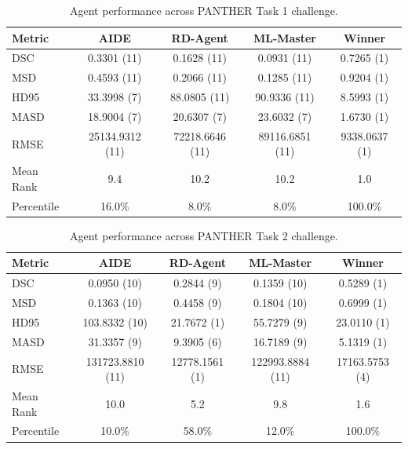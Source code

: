 \begin{table}[htbp]
\centering
\small
\caption{Agent performance across PANTHER Task 1 challenge.}
\vspace{3pt} \label{tab:panther-task1}
\begin{tabular}{lcccc}
\toprule
\textbf{Metric} & \textbf{AIDE} & \textbf{RD-Agent} & \textbf{ML-Master} & \textbf{Winner} \\
\midrule
DSC & 0.3301 (11) & 0.1628 (11) & 0.0931 (11) & 0.7265 (1) \\
MSD & 0.4593 (11) & 0.2066 (11) & 0.1285 (11) & 0.9204 (1) \\
HD95 & 33.3998 (7) & 88.0805 (11) & 90.9336 (11) & 8.5993 (1) \\
MASD & 18.9004 (7) & 20.6307 (7) & 23.6032 (7) & 1.6730 (1) \\
RMSE & 25134.9312 (11) & 72218.6646 (11) & 89116.6851 (11) & 9338.0637 (1) \\
\midrule
Mean Rank & 9.4 & 10.2 & 10.2 & 1.0 \\
Percentile & 16.0\% & 8.0\% & 8.0\% & 100.0\% \\
\bottomrule
\end{tabular}
\end{table}

\begin{table}[htbp]
\centering
\small
\caption{Agent performance across PANTHER Task 2 challenge.}
\vspace{3pt} \label{tab:panther-task2}
\begin{tabular}{lcccc}
\toprule
\textbf{Metric} & \textbf{AIDE} & \textbf{RD-Agent} & \textbf{ML-Master} & \textbf{Winner} \\
\midrule
DSC & 0.0950 (10) & 0.2844 (9) & 0.1359 (10) & 0.5289 (1) \\
MSD & 0.1363 (10) & 0.4458 (9) & 0.1804 (10) & 0.6999 (1) \\
HD95 & 103.8332 (10) & 21.7672 (1) & 55.7279 (9) & 23.0110 (1) \\
MASD & 31.3357 (9) & 9.3905 (6) & 16.7189 (9) & 5.1319 (1) \\
RMSE & 131723.8810 (11) & 12778.1561 (1) & 122993.8884 (11) & 17163.5753 (4) \\
\midrule
Mean Rank & 10.0 & 5.2 & 9.8 & 1.6 \\
Percentile & 10.0\% & 58.0\% & 12.0\% & 100.0\% \\
\bottomrule
\end{tabular}
\end{table}

